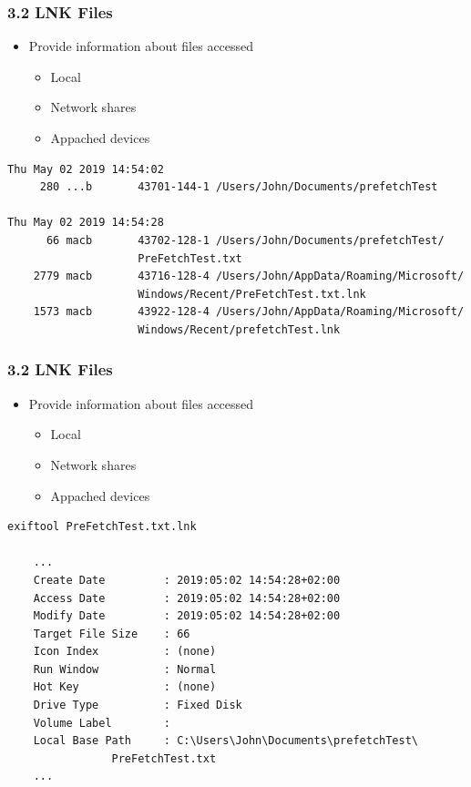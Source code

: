 \begin{frame}[fragile]
  \frametitle{3.2 LNK Files}
    \begin{itemize}
        \item Provide information about files accessed
        \begin{itemize}
            \item Local
            \item Network shares
            \item Appached devices
        \end{itemize}
    \end{itemize}
  \begin{lstlisting}[basicstyle=\tiny]
Thu May 02 2019 14:54:02
     280 ...b       43701-144-1 /Users/John/Documents/prefetchTest
  
Thu May 02 2019 14:54:28
      66 macb       43702-128-1 /Users/John/Documents/prefetchTest/
      				PreFetchTest.txt
    2779 macb       43716-128-4 /Users/John/AppData/Roaming/Microsoft/
    				Windows/Recent/PreFetchTest.txt.lnk
    1573 macb       43922-128-4 /Users/John/AppData/Roaming/Microsoft/
    				Windows/Recent/prefetchTest.lnk
  \end{lstlisting}
\end{frame}


\begin{frame}[fragile]
  \frametitle{3.2 LNK Files}
    \begin{itemize}
        \item Provide information about files accessed
        \begin{itemize}
            \item Local
            \item Network shares
            \item Appached devices
        \end{itemize}
    \end{itemize}
  \begin{lstlisting}[basicstyle=\tiny]
exiftool PreFetchTest.txt.lnk

	...
	Create Date         : 2019:05:02 14:54:28+02:00
	Access Date         : 2019:05:02 14:54:28+02:00
	Modify Date         : 2019:05:02 14:54:28+02:00
	Target File Size    : 66
	Icon Index          : (none)
	Run Window          : Normal
	Hot Key             : (none)
	Drive Type          : Fixed Disk
	Volume Label        :
	Local Base Path     : C:\Users\John\Documents\prefetchTest\
				PreFetchTest.txt
	...
  \end{lstlisting}
\end{frame}



